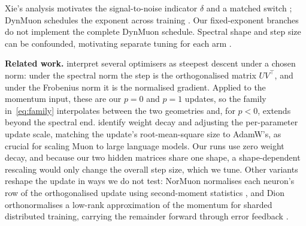\documentclass[11pt,a4paper]{article}
\begin{document}
Xie's analysis motivates the signal-to-noise indicator $\delta$ and a matched switch \citep{xie2026noise}; DynMuon schedules the exponent across training \citep{wu2026dynmuon}. Our fixed-exponent branches do not implement the complete DynMuon schedule. Spectral shape and step size can be confounded, motivating separate tuning for each arm \citep{shumaylov2026special}.

\textbf{Related work.} \citet{bernstein2024anthology} interpret several optimisers as steepest descent under a chosen norm: under the spectral norm the step is the orthogonalised matrix $UV^\top$, and under the Frobenius norm it is the normalised gradient. Applied to the momentum input, these are our $p=0$ and $p=1$ updates, so the family in~\eqref{eq:family} interpolates between the two geometries and, for $p<0$, extends beyond the spectral end. \citet{liu2025scalable} identify weight decay and adjusting the per-parameter update scale, matching the update's root-mean-square size to AdamW's, as crucial for scaling Muon to large language models. Our runs use zero weight decay, and because our two hidden matrices share one shape, a shape-dependent rescaling would only change the overall step size, which we tune. Other variants reshape the update in ways we do not test: NorMuon normalises each neuron's row of the orthogonalised update using second-moment statistics \citep{li2025normuon}, and Dion orthonormalises a low-rank approximation of the momentum for sharded distributed training, carrying the remainder forward through error feedback \citep{ahn2025dion}.

\end{document}
